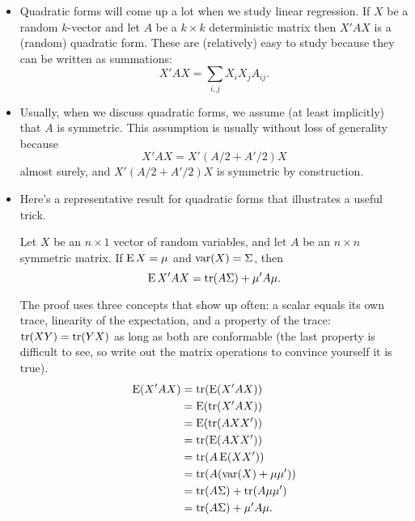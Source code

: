 \begin{itemize}[leftmargin=0pt]

\item Quadratic forms will come up a lot when we study linear
  regression.  If $X$ be a random $k$-vector and let $A$ be a $k \times k$
  deterministic matrix then $X'A X$ is a (random) quadratic form.
  These are (relatively) easy to study because they can be written as
  summations:
  \begin{equation*}
    X'AX = \sum_{i,j} X_i X_j A_{ij}.
  \end{equation*}

\item Usually, when we discuss quadratic forms, we assume (at least
  implicitly) that $A$ is symmetric.  This assumption is usually
  without loss of generality because
  \begin{equation*}
    X' A X = X'(A/2 + A'/2)X
  \end{equation*}
  almost surely, and $X'(A/2 + A'/2)X$ is symmetric by construction.

\item Here's a representative result for quadratic forms that
  illustrates a useful trick.
  \begin{thm}
    Let $X$ be an $n \times 1$ vector of random variables, and
    let $A$ be an $n \times n$ symmetric matrix.  If $\operatorname{E} X = \mu$ and $\operatorname{var}(X) =
    \Sigma$, then
    \begin{equation}
      \operatorname{E} X'AX = \operatorname{tr}(A \Sigma) + \mu'A\mu.
    \end{equation}
  \end{thm}

  The proof uses three concepts that show up often: a scalar equals
  its own trace, linearity of the expectation, and a property of the
  trace: $\operatorname{tr}(XY) = \operatorname{tr}(YX)$ as long as both are conformable (the last
  property is difficult to see, so write out the matrix operations to
  convince yourself it is true).
  \begin{align*}
    \operatorname{E}(X'AX) &= \operatorname{tr}(\operatorname{E}(X'AX)) \\
    &= \operatorname{E}(\operatorname{tr}(X'AX)) \\
    &= \operatorname{E}(\operatorname{tr}(AXX')) \\
    &= \operatorname{tr}(\operatorname{E}(AXX')) \\
    &= \operatorname{tr}(A \operatorname{E}(XX')) \\
    &= \operatorname{tr}(A (\operatorname{var}(X) + \mu\mu')) \\
    &= \operatorname{tr}(A\Sigma) + \operatorname{tr}(A \mu\mu') \\
    &= \operatorname{tr}(A\Sigma) + \mu'A\mu.
  \end{align*}


\end{itemize}
